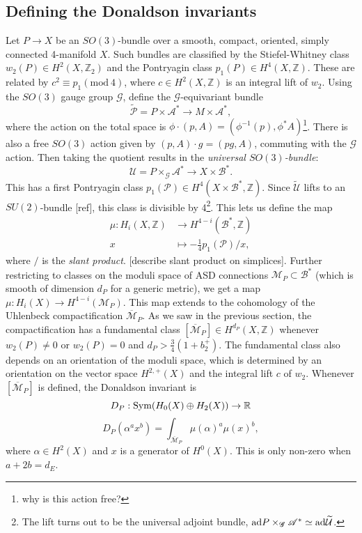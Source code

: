 \documentclass[a4paper]{article}
\newcommand{\Z}{\mathbb{Z}}
\newcommand{\A}{\mathscr{A}}
\newcommand{\B}{\mathscr{B}}
\newcommand{\U}{\mathcal{U}}
\newcommand{\GG}{\mathscr{G}}
\newcommand{\R}{\mathbb{R}}
\newcommand{\ra}{\rightarrow}
\newcommand{\Sym}{\textnormal{Sym}}
\newcommand{\ad}{\textnormal{ad}}
\theoremstyle{definition}
\numberwithin{theorem}{subsection}
\begin{document}
\subsection{Defining the Donaldson invariants}

Let $P\ra X$ be an $SO(3)$-bundle over a smooth, compact, oriented, simply connected 4-manifold $X$. Such bundles are classified by the Stiefel-Whitney class $w_2(P)\in H^2(X,\Z_2)$ and the Pontryagin class $p_1(P)\in H^4(X,\Z)$. These are related by $c^2\equiv p_1 (\text{mod}\ 4)$, where $c\in H^2(X,\Z)$ is an integral lift of $w_2$. Using the $SO(3)$ gauge group $\GG$, define the $\GG$-equivariant bundle $$\widetilde{\mathcal{P}}=P\times\A^*\ra M\times\A^*,$$
where the action on the total space is $\phi\cdot(p,A)=(\phi^{-1}(p),\phi^*A)$\footnote{why is this action free?}. There is also a free $SO(3)$ action given by $(p,A)\cdot g = (pg,A)$, commuting with the $\GG$ action. Then taking the quotient results in the \emph{universal $SO(3)$-bundle}:
$$\U=P\times_{\GG}\A^*\ra X\times\B^*.$$
This has a first Pontryagin class $p_1(\mathcal{P})\in H^4(X\times \B^*,\Z)$. Since $\widetilde{\U}$ lifts to an $SU(2)$-bundle [ref], this class is divisible by 4\footnote{The lift turns out to be the universal adjoint bundle, $\ad P \times_{\GG}\A^*\simeq \ad \widetilde{\U}$. }. This lets us define the map
\begin{align*}
    \mu: H_i(X,\Z) &\ra H^{4-i}(\B^*,\Z)\\
    x &\mapsto -\frac{1}{4}p_1(\mathcal{P})/x,
\end{align*}
where $/$ is the \emph{slant product}. [describe slant product on simplices]. Further restricting to classes on the moduli space of ASD connections $\mathcal{M}_{P}\subset \B^*$ (which is smooth of dimension $d_P$ for a generic metric), we get a map $\mu:H_i(X)\ra H^{4-i}(\mathcal{M}_{P})$. This map extends to the cohomology of the Uhlenbeck compactification $\overline{\mathcal{M}}_{P}$. As we saw in the previous section, the compactification has a fundamental class $[\overline{\mathcal{M}}_{P}]\in H^{d_P}(X,\Z)$ whenever $w_2(P)\neq 0$ or $w_2(P)=0$ and $d_P>\frac{3}{4}(1+b_2^+)$. The fundamental class also depends on an orientation of the moduli space, which is determined by an orientation on the vector space $H^{2,+}(X)$ and the integral lift $c$ of $w_2$. Whenever $[\overline{\mathcal{M}}_{P}]$ is defined, the Donaldson invariant is
$$D_P:\Sym(H_0(X)\oplus H_2(X))\ra \R$$
$$D_P(\alpha^a x^b)=\int_{\overline{\mathcal{M}}_{P}}\mu(\alpha)^a\mu(x)^b,$$
where $\alpha\in H^2(X)$ and $x$ is a generator of $H^0(X)$. This is only non-zero when $a+2b=d_E$. 
\end{document}
